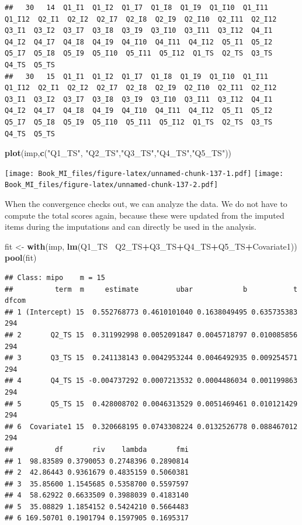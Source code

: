 \documentclass[
]{book}
\newenvironment{Shaded}{\begin{snugshade}}{\end{snugshade}}
\newcommand{\KeywordTok}[1]{\textcolor[rgb]{0.13,0.29,0.53}{\textbf{#1}}}
\newcommand{\NormalTok}[1]{#1}
\newcommand{\OperatorTok}[1]{\textcolor[rgb]{0.81,0.36,0.00}{\textbf{#1}}}
\newcommand{\StringTok}[1]{\textcolor[rgb]{0.31,0.60,0.02}{#1}}
\begin{document}
\begin{verbatim}
##   30   14  Q1_I1  Q1_I2  Q1_I7  Q1_I8  Q1_I9  Q1_I10  Q1_I11  Q1_I12  Q2_I1  Q2_I2  Q2_I7  Q2_I8  Q2_I9  Q2_I10  Q2_I11  Q2_I12  Q3_I1  Q3_I2  Q3_I7  Q3_I8  Q3_I9  Q3_I10  Q3_I11  Q3_I12  Q4_I1  Q4_I2  Q4_I7  Q4_I8  Q4_I9  Q4_I10  Q4_I11  Q4_I12  Q5_I1  Q5_I2  Q5_I7  Q5_I8  Q5_I9  Q5_I10  Q5_I11  Q5_I12  Q1_TS  Q2_TS  Q3_TS  Q4_TS  Q5_TS
##   30   15  Q1_I1  Q1_I2  Q1_I7  Q1_I8  Q1_I9  Q1_I10  Q1_I11  Q1_I12  Q2_I1  Q2_I2  Q2_I7  Q2_I8  Q2_I9  Q2_I10  Q2_I11  Q2_I12  Q3_I1  Q3_I2  Q3_I7  Q3_I8  Q3_I9  Q3_I10  Q3_I11  Q3_I12  Q4_I1  Q4_I2  Q4_I7  Q4_I8  Q4_I9  Q4_I10  Q4_I11  Q4_I12  Q5_I1  Q5_I2  Q5_I7  Q5_I8  Q5_I9  Q5_I10  Q5_I11  Q5_I12  Q1_TS  Q2_TS  Q3_TS  Q4_TS  Q5_TS
\end{verbatim}

\begin{Shaded}
\begin{Highlighting}[]
\KeywordTok{plot}\NormalTok{(imp,}\KeywordTok{c}\NormalTok{(}\StringTok{"Q1_TS"}\NormalTok{, }\StringTok{"Q2_TS"}\NormalTok{,}\StringTok{"Q3_TS"}\NormalTok{,}\StringTok{"Q4_TS"}\NormalTok{,}\StringTok{"Q5_TS"}\NormalTok{))}
\end{Highlighting}
\end{Shaded}

\texttt{[image: Book\_MI\_files/figure-latex/unnamed-chunk-137-1.pdf]} \texttt{[image: Book\_MI\_files/figure-latex/unnamed-chunk-137-2.pdf]}

When the convergence checks out, we can analyze the data. We do not have to compute the total scores again, because these were updated from the imputed items during the imputations and can directly be used in the analysis.

\begin{Shaded}
\begin{Highlighting}[]
\NormalTok{fit <-}\StringTok{ }\KeywordTok{with}\NormalTok{(imp, }\KeywordTok{lm}\NormalTok{(Q1_TS}\OperatorTok{~}\StringTok{ }\NormalTok{Q2_TS}\OperatorTok{+}\NormalTok{Q3_TS}\OperatorTok{+}\NormalTok{Q4_TS}\OperatorTok{+}\NormalTok{Q5_TS}\OperatorTok{+}\NormalTok{Covariate1))}
\KeywordTok{pool}\NormalTok{(fit)}
\end{Highlighting}
\end{Shaded}

\begin{verbatim}
## Class: mipo    m = 15 
##          term  m     estimate         ubar            b           t dfcom
## 1 (Intercept) 15  0.552768773 0.4610101040 0.1638049495 0.635735383   294
## 2       Q2_TS 15  0.311992998 0.0052091847 0.0045718797 0.010085856   294
## 3       Q3_TS 15  0.241138143 0.0042953244 0.0046492935 0.009254571   294
## 4       Q4_TS 15 -0.004737292 0.0007213532 0.0004486034 0.001199863   294
## 5       Q5_TS 15  0.428008702 0.0046313529 0.0051469461 0.010121429   294
## 6  Covariate1 15  0.320668195 0.0743308224 0.0132526778 0.088467012   294
##          df       riv    lambda       fmi
## 1  98.83589 0.3790053 0.2748396 0.2890814
## 2  42.86443 0.9361679 0.4835159 0.5060381
## 3  35.85600 1.1545685 0.5358700 0.5597597
## 4  58.62922 0.6633509 0.3988039 0.4183140
## 5  35.08829 1.1854152 0.5424210 0.5664483
## 6 169.50701 0.1901794 0.1597905 0.1695317
\end{verbatim}
\end{document}
